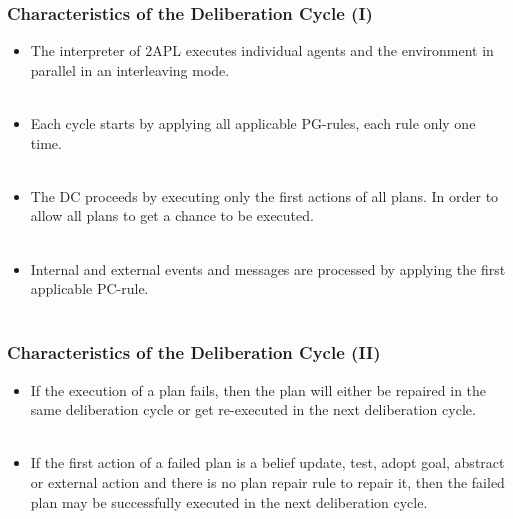 	\begin{frame}
		\frametitle{Characteristics of the Deliberation Cycle (I)}
		\begin{itemize}
			
			\item The interpreter of 2APL executes individual agents and the environment in
			parallel in an interleaving mode.\\~\\
			
			\item Each cycle starts by applying all applicable PG-rules, each rule only one time. \\~\\
			
			\item The DC proceeds by executing only the first actions of all plans. In order to allow all plans to get a chance to be executed. \\~\\
			
			\item  Internal and external events and messages are processed by applying the first applicable PC-rule. \\~\\
			
		\end{itemize}
	\end{frame}
	
	\begin{frame}
		\frametitle{Characteristics of the Deliberation Cycle (II)}
		\begin{itemize}
			
			\item If the execution of a plan fails, then the plan will either be repaired in the same
			deliberation cycle or get re-executed in the next deliberation cycle. \\~\\
			
			\item If the first action of a failed plan is a belief update, test, adopt
			goal, abstract or external action and there is no plan repair rule to
			repair it, then the failed plan may be successfully executed in the next deliberation cycle. \\~\\
			
		\end{itemize}
	\end{frame}